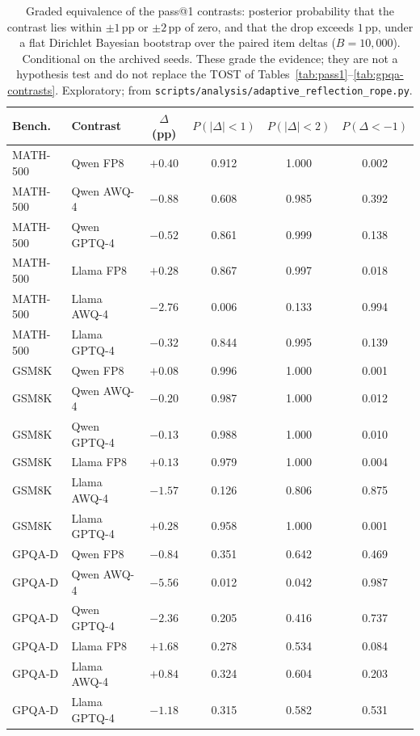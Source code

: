 \documentclass[11pt,a4paper]{article}
\begin{document}
\begin{table}[t]
\centering
\caption{Graded equivalence of the pass@1 contrasts: posterior probability that the contrast lies within $\pm 1$\,pp or $\pm 2$\,pp of zero, and that the drop exceeds $1$\,pp, under a flat Dirichlet Bayesian bootstrap over the paired item deltas ($B=10{,}000$). Conditional on the archived seeds. These grade the evidence; they are not a hypothesis test and do not replace the TOST of Tables~\ref{tab:pass1}--\ref{tab:gpqa-contrasts}. Exploratory; from \texttt{scripts/analysis/adaptive\_reflection\_rope.py}.}
\label{tab:rope}
\small
\begin{tabular}{llcccc}
\toprule
\textbf{Bench.} & \textbf{Contrast} & $\Delta$ (pp) & $P(|\Delta|<1)$ & $P(|\Delta|<2)$ & $P(\Delta<-1)$ \\
\midrule
MATH-500 & Qwen FP8 & $+0.40$ & 0.912 & 1.000 & 0.002 \\
MATH-500 & Qwen AWQ-4 & $-0.88$ & 0.608 & 0.985 & 0.392 \\
MATH-500 & Qwen GPTQ-4 & $-0.52$ & 0.861 & 0.999 & 0.138 \\
MATH-500 & Llama FP8 & $+0.28$ & 0.867 & 0.997 & 0.018 \\
MATH-500 & Llama AWQ-4 & $-2.76$ & 0.006 & 0.133 & 0.994 \\
MATH-500 & Llama GPTQ-4 & $-0.32$ & 0.844 & 0.995 & 0.139 \\
\midrule
GSM8K & Qwen FP8 & $+0.08$ & 0.996 & 1.000 & 0.001 \\
GSM8K & Qwen AWQ-4 & $-0.20$ & 0.987 & 1.000 & 0.012 \\
GSM8K & Qwen GPTQ-4 & $-0.13$ & 0.988 & 1.000 & 0.010 \\
GSM8K & Llama FP8 & $+0.13$ & 0.979 & 1.000 & 0.004 \\
GSM8K & Llama AWQ-4 & $-1.57$ & 0.126 & 0.806 & 0.875 \\
GSM8K & Llama GPTQ-4 & $+0.28$ & 0.958 & 1.000 & 0.001 \\
\midrule
GPQA-D & Qwen FP8 & $-0.84$ & 0.351 & 0.642 & 0.469 \\
GPQA-D & Qwen AWQ-4 & $-5.56$ & 0.012 & 0.042 & 0.987 \\
GPQA-D & Qwen GPTQ-4 & $-2.36$ & 0.205 & 0.416 & 0.737 \\
GPQA-D & Llama FP8 & $+1.68$ & 0.278 & 0.534 & 0.084 \\
GPQA-D & Llama AWQ-4 & $+0.84$ & 0.324 & 0.604 & 0.203 \\
GPQA-D & Llama GPTQ-4 & $-1.18$ & 0.315 & 0.582 & 0.531 \\
\bottomrule
\end{tabular}
\end{table}
\end{document}
